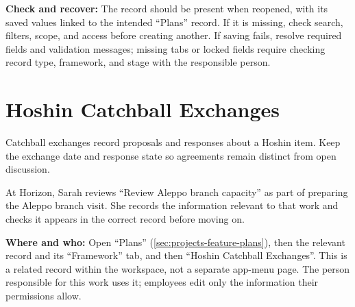 \textbf{Check and recover:} The record should be present when reopened, with its saved values linked to the intended “Plans” record. If it is missing, check search, filters, scope, and access before creating another. If saving fails, resolve required fields and validation messages; missing tabs or locked fields require checking record type, framework, and stage with the responsible person.

\clearpage
\section{Hoshin Catchball Exchanges}
\label{sec:projects-feature-planning-hoshin-catchball-exchanges}

Catchball exchanges record proposals and responses about a Hoshin item. Keep the exchange date and response state so agreements remain distinct from open discussion.

\begin{rcnote}
At Horizon, Sarah reviews “Review Aleppo branch capacity” as part of preparing the Aleppo branch visit. She records the information relevant to that work and checks it appears in the correct record before moving on.
\end{rcnote}

\textbf{Where and who:} Open “Plans” (\ref{sec:projects-feature-plans}), then the relevant record and its “Framework” tab, and then “Hoshin Catchball Exchanges”. This is a related record within the workspace, not a separate app-menu page. The person responsible for this work uses it; employees edit only the information their permissions allow.

